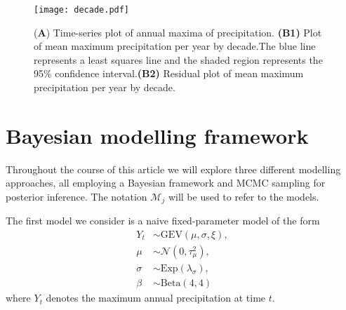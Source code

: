 \documentclass[12pt, a4paper]{article}
\begin{document}
  \begin{figure}[H]
    \begin{center}
      \texttt{[image: decade.pdf]}
    \end{center}
    \caption{(\textbf{A}) Time-series plot of annual maxima of precipitation.
    \textbf{(B1)} Plot of mean maximum precipitation per year by decade.\@ The
    blue line represents a least squares line and the shaded region represents
    the 95\% confidence interval.\@ \textbf{(B2)} Residual plot of mean maximum
    precipitation per year by decade.}
    \label{fig:timeseries_precip}
  \end{figure}

  \section{Bayesian modelling framework}
  Throughout the course of this article we will explore three different
  modelling approaches, all employing a Bayesian framework and MCMC sampling
  for posterior inference. The notation \(\mathcal M_j\) will be used to refer
  to the models.

  The first model we consider is a naive fixed-parameter model of the form
  \begin{align*}
    Y_t &\sim \mathrm{GEV}(\mu, \sigma, \xi), \\
    \mu &\sim \mathcal N(0, \tau_\mu^2), \\
    \sigma &\sim \mathrm{Exp}(\lambda_\sigma), \\
    \beta &\sim \mathrm{Beta}(4, 4)
  \end{align*}
  where \(Y_t\) denotes the maximum annual precipitation at time \(t\).
\end{document}
